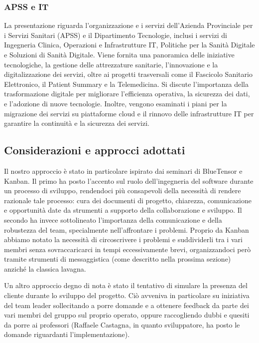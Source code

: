 \documentclass[11pt, a4paper]{article}
\theoremstyle{definition}
\begin{document}
\subsubsection{APSS e IT}
La presentazione riguarda l'organizzazione e i servizi dell'Azienda Provinciale
per i Servizi Sanitari (APSS) e il Dipartimento Tecnologie, inclusi i servizi di
Ingegneria Clinica, Operazioni e Infrastrutture IT, Politiche per la Sanità
Digitale e Soluzioni di Sanità Digitale. Viene fornita una panoramica delle
iniziative tecnologiche, la gestione delle attrezzature sanitarie, l'innovazione
e la digitalizzazione dei servizi, oltre ai progetti trasversali come il Fascicolo
Sanitario Elettronico, il Patient Summary e la Telemedicina. Si discute l'importanza
della trasformazione digitale per migliorare l'efficienza operativa, la sicurezza
dei dati, e l'adozione di nuove tecnologie. Inoltre, vengono esaminati i piani
per la migrazione dei servizi su piattaforme cloud e il rinnovo delle infrastrutture
IT per garantire la continuità e la sicurezza dei servizi.

\subsection{Considerazioni e approcci adottati}
Il nostro approccio è stato in particolare ispirato dai seminari
di BlueTensor e Kanban. Il primo ha posto l'accento sul ruolo
dell'ingegneria del software durante un processo di sviluppo,
rendendoci più consapevoli della necessità di rendere razionale
tale processo: cura dei documenti di progetto, chiarezza,
comunicazione e opportunità date da strumenti a supporto della
collaborazione e sviluppo. Il secondo ha invece sottolineato
l'importanza della comunicazione e della robustezza del team,
specialmente nell'affrontare i problemi. Proprio da Kanban abbiamo
notato la necessità di circoscrivere i problemi e suddividerli
tra i vari membri senza sovraccaricarci in tempi eccessivamente brevi,
organizzandoci però tramite strumenti di messaggistica
(come descritto nella prossima sezione) anziché la classica lavagna.

Un altro approccio degno di nota è stato il tentativo di
simulare la presenza del cliente durante lo sviluppo del progetto.
Ciò avveniva in particolare su iniziativa del team leader sollecitando
a porre domande e a ottenere feedback da parte dei vari membri del
gruppo sul proprio operato, oppure raccogliendo dubbi e quesiti
da porre ai professori (Raffaele Castagna, in quanto sviluppatore,
ha posto le domande riguardanti l'implementazione).
\end{document}
